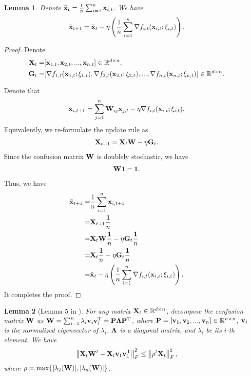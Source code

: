 \documentclass{article}
\newtheorem{Lemma}{\bf{Lemma}}
\begin{document}
\begin{Lemma}
\label{Lemma_average_update_rule}
Denote $\bar{{\bf x}}_t = \frac{1}{n}\sum_{i=1}^n {\bf x}_{i,t}$. We have
\begin{align}
\nonumber
\bar{{\bf x}}_{t+1} =  \bar{{\bf x}}_{t} - \eta \left( \frac{1}{n} \sum_{i=1}^n \nabla f_{i,t}({\bf x}_{i,t};\xi_{i,t}) \right). 
\end{align}
\end{Lemma}
\begin{proof}
Denote
\begin{align}
\nonumber
{\bf X}_t = &  [{\bf x}_{1,t}, {\bf x}_{2,t}, ..., {\bf x}_{n,t}] \in \mathbb{R}^{d\times n}, \\ \nonumber
{\bf G}_t = & [\nabla f_{1,t}({\bf x}_{1,t};\xi_{1,t}), \nabla f_{2,t}({\bf x}_{2,t};\xi_{2,t}), ..., \nabla f_{n,t}({\bf x}_{n,t};\xi_{n,t})] \in \mathbb{R}^{d\times n}.
\end{align}

Denote that 
\begin{align}
\nonumber
{\bf x}_{i,t+1} = \sum_{j=1}^n {\bf W}_{ij}{\bf x}_{j,t} - \eta \nabla f_{i,t}({\bf x}_{i,t};\xi_{i,t}).
\end{align} Equivalently, we re-formulate the update rule as
\begin{align}
\nonumber
{\bf X}_{t+1} = {\bf X}_{t}{\bf W} - \eta {\bf G}_t.
\end{align} Since the confusion matrix ${\bf W}$ is doublely stochastic, we have
\begin{align}
\nonumber
{\bf W} {\bf 1} = {\bf 1}.
\end{align} Thus, we have
\begin{align}
\nonumber
\bar{{\bf x}}_{t+1} = & \frac{1}{n}\sum_{i=1}^n {\bf x}_{i,t+1} \\ \nonumber
= & {\bf X}_{t+1}\frac{{\bf 1}}{n} \\ \nonumber 
= & {\bf X}_{t}{\bf W}\frac{{\bf 1}}{n} - \eta {\bf G}_t\frac{{\bf 1}}{n} \\ \nonumber
= & {\bf X}_{t}\frac{{\bf 1}}{n} - \eta {\bf G}_t\frac{{\bf 1}}{n} \\ \nonumber
=& \bar{{\bf x}}_{t} - \eta \left( \frac{1}{n} \sum_{i=1}^n \nabla f_{i,t}({\bf x}_{i,t};\xi_{i,t}) \right). 
\end{align} It completes the proof.
\end{proof}

\begin{Lemma}[Lemma $5$ in \citep{Tang:2018un}]
\label{Lemma_hanlin_1}
For any matrix ${\bf X}_t\in\mathbb{R}^{d\times n}$, decompose the confusion matrix ${\bf W}$ as ${\bf W} = \sum_{i=1}^n \lambda_i {\bf v}_i {\bf v}_i^{\rm T} = {\bf P} \mathbf{\Lambda} {\bf P}^{\rm T}$, where ${\bf P} = [{\bf v}_1, {\bf v}_2, ..., {\bf v}_n]\in\mathbb{R}^{n\times n}$, ${\bf v}_i$ is the normalized eigenvector of $\lambda_i$. $\mathbf{\Lambda}$ is a diagonal matrix, and $\lambda_i$ be its $i$-th element. We have
\begin{align}
\nonumber
\left\lVert{\bf X}_t {\bf W}^t - {\bf X}_t {\bf v}_1 {\bf v}_1^{\rm T} \right\rVert_F^2 \le \left\lVert\rho^t {\bf X}_t\right\rVert_F^2, 
\end{align} where  $\rho = \max \{| \lambda_2({\bf W}) |, | \lambda_n({\bf W}) |\}$. 

\end{Lemma}
\end{document}
